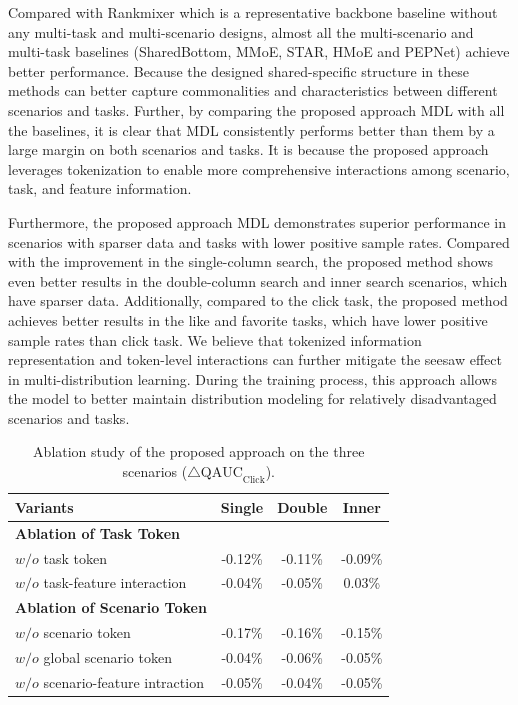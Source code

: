 Compared with Rankmixer which is a representative backbone baseline without any multi-task and multi-scenario designs, almost all the multi-scenario and multi-task baselines (SharedBottom, MMoE, STAR, HMoE and PEPNet) achieve better performance.
Because the designed shared-specific structure in these methods can better capture commonalities and characteristics between different scenarios and tasks.
Further, by comparing the proposed approach MDL with all the baselines, it is clear that MDL consistently performs better than them by a large margin on both scenarios and tasks.
It is because the proposed approach leverages tokenization to enable more comprehensive interactions among scenario, task, and feature information.

Furthermore, the proposed approach MDL demonstrates superior performance in scenarios with sparser data and tasks with lower positive sample rates.
Compared with the improvement in the single-column search, the proposed method shows even better results in the double-column search and inner search scenarios, which have sparser data.
Additionally, compared to the click task, the proposed method achieves better results in the like and favorite tasks, which have lower positive sample rates than click task.
We believe that tokenized information representation and token-level interactions can further mitigate the seesaw effect in multi-distribution learning.
During the training process, this approach allows the model to better maintain distribution modeling for relatively disadvantaged scenarios and tasks.


\begin{table}[htbp]
    \centering
    \caption{Ablation study of the proposed approach on the three scenarios ($\triangle\text{QAUC}_{\text{Click}}$).}
    \label{tab:ablation}
        \begin{tabular}{l c c c}
            \toprule
            Variants & Single & Double & Inner\\
            \midrule
            \textbf{Ablation of Task Token} \\
            \midrule
            $w/o$ task token & -0.12\% & -0.11\% & -0.09\% \\
            $w/o$ task-feature interaction & -0.04\% & -0.05\% & 0.03\% \\
            \midrule
            \textbf{Ablation of Scenario Token} \\
            \midrule
            $w/o$ scenario token & -0.17\% & -0.16\% & -0.15\% \\
            $w/o$ global scenario token & -0.04\% & -0.06\% & -0.05\% \\
            $w/o$ scenario-feature intraction & -0.05\% & -0.04\% & -0.05\% \\
            \bottomrule
        \end{tabular}
\end{table}

